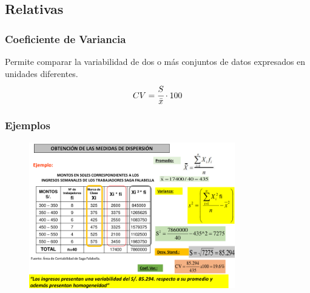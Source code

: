 \documentclass{article}
\begin{document}
    \subsection{Relativas}
        \subsubsection{Coeficiente de Variancia}
        Permite comparar la variabilidad de dos o más conjuntos de datos expresados en unidades diferentes.
        \[CV = \cfrac{S}{\bar{x}}\cdot 100\]
        \subsubsection{Ejemplos}
        \begin{figure}[H]
            \centering
            \includegraphics[width=0.8\textwidth]{img/dispersion.png}
        \end{figure}
\end{document}
